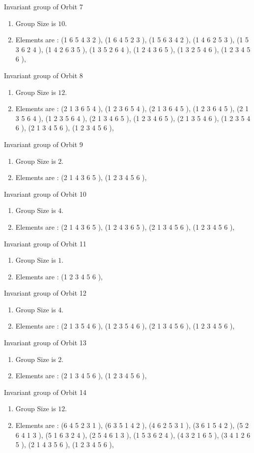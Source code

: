\documentclass[12pt]{article}
\begin{document}
Invariant group of Orbit 7
\begin{enumerate}
\item Group Size is $10$.
\item Elements are : (1 6 5 4 3 2  ), (1 6 4 5 2 3  ), (1 5 6 3 4 2  ), (1 4 6 2 5 3  ), (1 5 3 6 2 4  ), (1 4 2 6 3 5  ), (1 3 5 2 6 4  ), (1 2 4 3 6 5  ), (1 3 2 5 4 6  ), (1 2 3 4 5 6  ), 
\end{enumerate}
Invariant group of Orbit 8
\begin{enumerate}
\item Group Size is $12$.
\item Elements are : (2 1 3 6 5 4  ), (1 2 3 6 5 4  ), (2 1 3 6 4 5  ), (1 2 3 6 4 5  ), (2 1 3 5 6 4  ), (1 2 3 5 6 4  ), (2 1 3 4 6 5  ), (1 2 3 4 6 5  ), (2 1 3 5 4 6  ), (1 2 3 5 4 6  ), (2 1 3 4 5 6  ), (1 2 3 4 5 6  ), 
\end{enumerate}
Invariant group of Orbit 9
\begin{enumerate}
\item Group Size is $2$.
\item Elements are : (2 1 4 3 6 5  ), (1 2 3 4 5 6  ), 
\end{enumerate}
Invariant group of Orbit 10
\begin{enumerate}
\item Group Size is $4$.
\item Elements are : (2 1 4 3 6 5  ), (1 2 4 3 6 5  ), (2 1 3 4 5 6  ), (1 2 3 4 5 6  ), 
\end{enumerate}
Invariant group of Orbit 11
\begin{enumerate}
\item Group Size is $1$.
\item Elements are : (1 2 3 4 5 6  ), 
\end{enumerate}
Invariant group of Orbit 12
\begin{enumerate}
\item Group Size is $4$.
\item Elements are : (2 1 3 5 4 6  ), (1 2 3 5 4 6  ), (2 1 3 4 5 6  ), (1 2 3 4 5 6  ), 
\end{enumerate}
Invariant group of Orbit 13
\begin{enumerate}
\item Group Size is $2$.
\item Elements are : (2 1 3 4 5 6  ), (1 2 3 4 5 6  ), 
\end{enumerate}
Invariant group of Orbit 14
\begin{enumerate}
\item Group Size is $12$.
\item Elements are : (6 4 5 2 3 1  ), (6 3 5 1 4 2  ), (4 6 2 5 3 1  ), (3 6 1 5 4 2  ), (5 2 6 4 1 3  ), (5 1 6 3 2 4  ), (2 5 4 6 1 3  ), (1 5 3 6 2 4  ), (4 3 2 1 6 5  ), (3 4 1 2 6 5  ), (2 1 4 3 5 6  ), (1 2 3 4 5 6  ), 
\end{enumerate}
\end{document}
